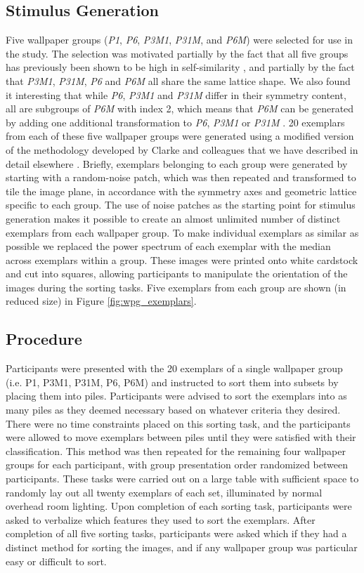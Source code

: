\documentclass[11pt, twoside]{article}
\begin{document}
\subsection*{Stimulus Generation}
Five wallpaper groups (\textit{P1}, \textit{P6}, \textit{P3M1}, \textit{P31M}, and \textit{P6M}) were selected for use in the study. The selection was motivated partially by the fact that all five groups has previously been shown to be high in self-similarity \citep{RN172}, and partially by the fact that \textit{P3M1}, \textit{P31M}, \textit{P6} and \textit{P6M} all share the same lattice shape. We also found it interesting that while \textit{P6}, \textit{P3M1} and \textit{P31M} differ in their symmetry content, all are subgroups of \textit{P6M} with index 2, which means that \textit{P6M} can be generated by adding one additional transformation to \textit{P6}, \textit{P3M1} or \textit{P31M} \citep{kohler_clarke_2021}. 20 exemplars from each of these five wallpaper groups were generated using a modified version of the methodology developed by Clarke and colleagues \citep{RN172} that we have described in detail elsewhere \citep{RN1725}. Briefly, exemplars belonging to each group were generated by starting with a random-noise patch, which was then repeated and transformed to tile the image plane, in accordance with the symmetry axes and geometric lattice specific to each group. The use of noise patches as the starting point for stimulus generation makes it possible to create an almost unlimited number of distinct exemplars from each wallpaper group. To make individual exemplars as similar as possible we replaced the power spectrum of each exemplar with the median across exemplars within a group. These images were printed onto white cardstock and cut into squares, allowing participants to manipulate the orientation of the images during the sorting tasks. Five exemplars from each group are shown (in reduced size) in Figure \ref{fig:wpg_exemplars}. 

\subsection*{Procedure}
Participants were presented with the 20 exemplars of a single wallpaper group (i.e. P1, P3M1, P31M, P6, P6M) and instructed to sort them into subsets by placing them into piles. Participants were advised to sort the exemplars into as many piles as they deemed necessary based on whatever criteria they desired. There were no time constraints placed on this sorting task, and the participants were allowed to move exemplars between piles until they were satisfied with their classification. This method was then repeated for the remaining four wallpaper groups for each participant, with group presentation order randomized between participants. These tasks were carried out on a large table with sufficient space to randomly lay out all twenty exemplars of each set, illuminated by normal overhead room lighting. Upon completion of each sorting task, participants were asked to verbalize which features they used to sort the exemplars. After completion of all five sorting tasks, participants were asked which if they had a distinct method for sorting the images, and if any wallpaper group was particular easy or difficult to sort.
\end{document}
